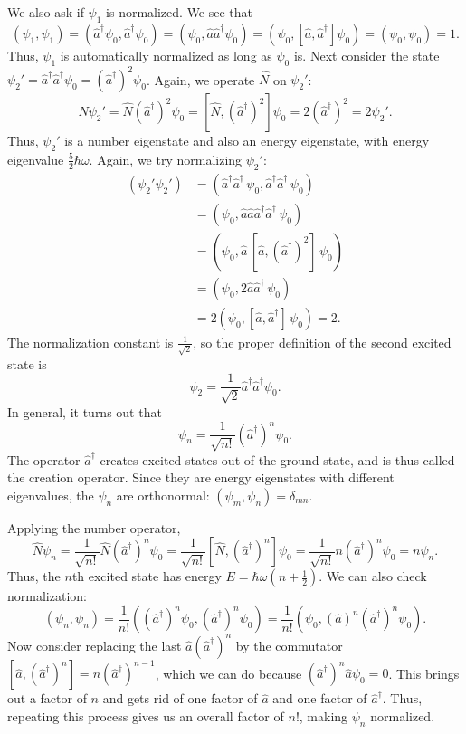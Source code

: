 We also ask if $\psi_1$ is normalized. We see that$$(\psi_1,\psi_1)=(\hat{a}^\dagger\psi_0,\hat{a}^\dagger\psi_0)=(\psi_0,\hat{a}\hat{a}^\dagger\psi_0)=(\psi_0,[\hat{a},\hat{a}^\dagger]\psi_0)=(\psi_0,\psi_0)=1.$$Thus, $\psi_1$ is automatically normalized as long as $\psi_0$ is. Next consider the state $\psi_2'=\hat{a}^\dagger\hat{a}^\dagger\psi_0=(\hat{a}^\dagger)^2\psi_0$. Again, we operate $\hat{N}$ on $\psi_2'$: $$\hat{N}\psi_2'=\hat{N}(\hat{a}^\dagger)^2\psi_0=[\hat{N},(\hat{a}^\dagger)^2]\psi_0=2(\hat{a}^\dagger)^2=2\psi_2'.$$Thus, $\psi_2'$ is a number eigenstate and also an energy eigenstate, with energy eigenvalue $\frac{5}{2}\hbar\omega$. Again, we try normalizing $\psi_2'$: \begin{align*}(\psi_2'\psi_2') &= (\hat{a}^\dagger\hat{a}^\dagger\,\psi_0,\hat{a}^\dagger\hat{a}^\dagger\,\psi_0)\\ &=(\psi_0,\hat{a}\hat{a}\hat{a}^\dagger\hat{a}^\dagger\,\psi_0) \\ &=(\psi_0,\hat{a}\,[\hat{a},(\hat{a}^\dagger)^2]\,\psi_0) \\ &=(\psi_0,2\hat{a}\hat{a}^\dagger\,\psi_0) \\ &=2(\psi_0,[\hat{a},\hat{a}^\dagger]\,\psi_0)=2.\end{align*}The normalization constant is $\frac{1}{\sqrt{2}}$, so the proper definition of the second excited state is $$\psi_2=\frac{1}{\sqrt{2}}\hat{a}^\dagger\hat{a}^\dagger\psi_0.$$In general, it turns out that $$\boxed{\psi_n=\frac{1}{\sqrt{n!}}(\hat{a}^\dagger)^n\psi_0.}$$The operator $\hat{a}^\dagger$ creates excited states out of the ground state, and is thus called the creation operator. Since they are energy eigenstates with different eigenvalues, the $\psi_n$ are orthonormal: $(\psi_m,\psi_n)=\delta_{mn}$.

Applying the number operator, $$\hat{N}\psi_n=\frac{1}{\sqrt{n!}}\hat{N}(\hat{a}^\dagger)^n\psi_0=\frac{1}{\sqrt{n!}}[\hat{N},(\hat{a}^\dagger)^n]\psi_0=\frac{1}{\sqrt{n!}}n(\hat{a}^\dagger)^n\psi_0=n\psi_n.$$Thus, the $n$th excited state has energy $E=\hbar\omega(n+\frac{1}{2})$. We can also check normalization: $$(\psi_n,\psi_n)=\frac{1}{n!}((\hat{a}^\dagger)^n\psi_0,(\hat{a}^\dagger)^n\psi_0)=\frac{1}{n!}(\psi_0,(\hat{a})^n(\hat{a}^\dagger)^n\psi_0).$$Now consider replacing the last $\hat{a}(\hat{a}^\dagger)^n$ by the commutator $[\hat{a},(\hat{a}^\dagger)^n]=n(\hat{a}^\dagger)^{n-1}$, which we can do because $(\hat{a}^\dagger)^n\hat{a}\psi_0=0$. This brings out a factor of $n$ and gets rid of one factor of $\hat{a}$ and one factor of $\hat{a}^\dagger$. Thus, repeating this process gives us an overall factor of $n!$, making $\psi_n$ normalized.

